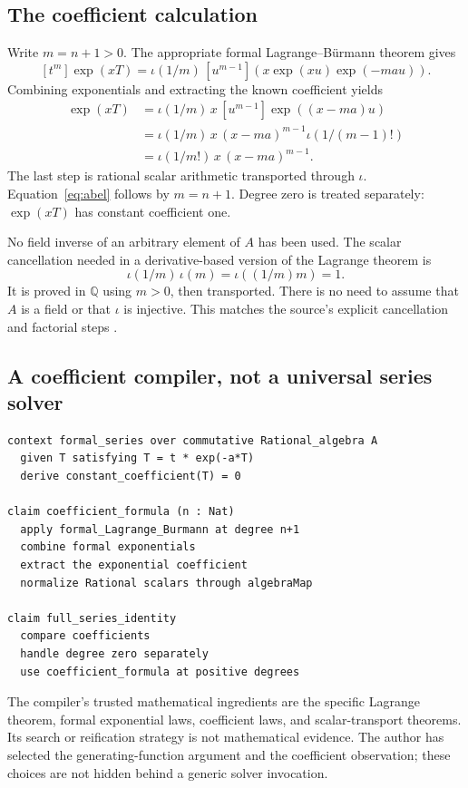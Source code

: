 \documentclass[11pt,a4paper]{article}
\newcommand{\Q}{\mathbb{Q}}
\theoremstyle{definition}
\begin{document}
\subsection{The coefficient calculation}
Write $m=n+1>0$. The appropriate formal Lagrange--B\"urmann theorem gives
\[
 [t^m]\exp(xT)
 =\iota(1/m)\,[u^{m-1}]
   \left(x\exp(xu)\exp(-mau)\right).
\]
Combining exponentials and extracting the known coefficient yields
\begin{align*}
 [t^m]\exp(xT)
 &=\iota(1/m)\,x\,[u^{m-1}]\exp((x-ma)u)\\
 &=\iota(1/m)\,x\,(x-ma)^{m-1}\iota(1/(m-1)!)\\
 &=\iota(1/m!)\,x\,(x-ma)^{m-1}.
\end{align*}
The last step is rational scalar arithmetic transported through $\iota$.
Equation~\eqref{eq:abel} follows by $m=n+1$. Degree zero is treated separately:
$\exp(xT)$ has constant coefficient one.

No field inverse of an arbitrary element of $A$ has been used. The scalar
cancellation needed in a derivative-based version of the Lagrange theorem is
\[
 \iota(1/m)\,\iota(m)=\iota((1/m)m)=1.
\]
It is proved in $\Q$ using $m>0$, then transported. There is no need to assume
that $A$ is a field or that $\iota$ is injective. This matches the source's
explicit cancellation and factorial steps \cite{p-abel}.

\subsection{A coefficient compiler, not a universal series solver}
\par\noindent\begin{minipage}{\linewidth}
\begin{lstlisting}
context formal_series over commutative Rational_algebra A
  given T satisfying T = t * exp(-a*T)
  derive constant_coefficient(T) = 0

claim coefficient_formula (n : Nat)
  apply formal_Lagrange_Burmann at degree n+1
  combine formal exponentials
  extract the exponential coefficient
  normalize Rational scalars through algebraMap

claim full_series_identity
  compare coefficients
  handle degree zero separately
  use coefficient_formula at positive degrees
\end{lstlisting}
\end{minipage}\par
The compiler's trusted mathematical ingredients are the specific Lagrange theorem,
formal exponential laws, coefficient laws, and scalar-transport theorems.
Its search or reification strategy is not mathematical evidence. The author has
selected the generating-function argument and the coefficient observation;
these choices are not hidden behind a generic solver invocation.
\end{document}
